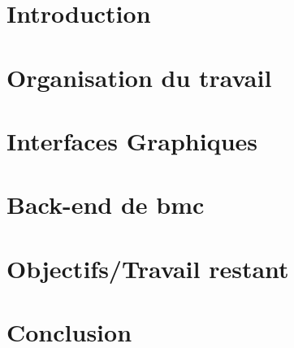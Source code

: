 \documentclass[a4paper
,oneside,11pt]{article}
\begin{document}
\section*{Introduction}\thispagestyle{fancy}



\section{Organisation du travail}


\section{Interfaces Graphiques}


\section{Back-end de bmc}


\section{Objectifs/Travail restant}


\section*{Conclusion}\thispagestyle{fancy}



%
\end{document}
